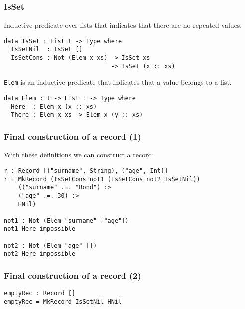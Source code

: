 \documentclass{beamer}
\begin{document}
\begin{frame}[fragile]
\frametitle{IsSet}

Inductive predicate over lists that indicates that there are no repeated values.

\pause

\begin{definition}
\begin{verbatim}
data IsSet : List t -> Type where
  IsSetNil  : IsSet []
  IsSetCons : Not (Elem x xs) -> IsSet xs
                              -> IsSet (x :: xs)
\end{verbatim}
\end{definition}

\pause

\texttt{Elem} is an inductive predicate that indicates that a value belongs to a list.

\begin{definition}
\begin{verbatim}
data Elem : t -> List t -> Type where
  Here  : Elem x (x :: xs)
  There : Elem x xs -> Elem x (y :: xs)
\end{verbatim}
\end{definition}

\end{frame}

\begin{frame}[fragile]
\frametitle{Final construction of a record (1)}

With these definitions we can construct a record:

\begin{example}
\begin{verbatim}
r : Record [("surname", String), ("age", Int)]
r = MkRecord (IsSetCons not1 (IsSetCons not2 IsSetNil)) 
    (("surname" .=. "Bond") :>
    ("age" .=. 30) :>
    HNil)

not1 : Not (Elem "surname" ["age"])
not1 Here impossible

not2 : Not (Elem "age" [])
not2 Here impossible
\end{verbatim}
\end{example}
\end{frame}

\begin{frame}[fragile]
\frametitle{Final construction of a record (2)}

\begin{example}
\begin{verbatim}
emptyRec : Record []
emptyRec = MkRecord IsSetNil HNil
\end{verbatim}
\end{example}

\end{frame}
\end{document}
